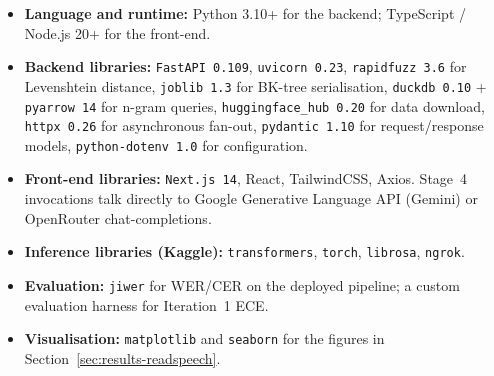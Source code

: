 \begin{itemize}
  \item \textbf{Language and runtime:} Python 3.10+ for the backend; TypeScript / Node.js 20+ for the front-end.
  \item \textbf{Backend libraries:} \texttt{FastAPI 0.109}, \texttt{uvicorn 0.23}, \texttt{rapidfuzz 3.6} for Levenshtein distance, \texttt{joblib 1.3} for BK-tree serialisation, \texttt{duckdb 0.10} + \texttt{pyarrow 14} for n-gram queries, \texttt{huggingface\_hub 0.20} for data download, \texttt{httpx 0.26} for asynchronous fan-out, \texttt{pydantic 1.10} for request/response models, \texttt{python-dotenv 1.0} for configuration.
  \item \textbf{Front-end libraries:} \texttt{Next.js 14}, React, TailwindCSS, Axios. Stage~4 invocations talk directly to Google Generative Language API (Gemini) or OpenRouter chat-completions.
  \item \textbf{Inference libraries (Kaggle):} \texttt{transformers}, \texttt{torch}, \texttt{librosa}, \texttt{ngrok}.
  \item \textbf{Evaluation:} \texttt{jiwer} for WER/CER on the deployed pipeline; a custom evaluation harness for Iteration~1 ECE.
  \item \textbf{Visualisation:} \texttt{matplotlib} and \texttt{seaborn} for the figures in Section~\ref{sec:results-readspeech}.
\end{itemize}

